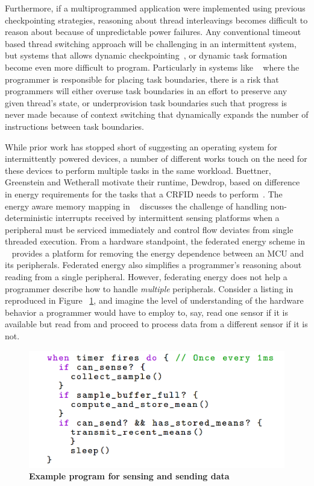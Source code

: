 \documentclass[11pt]{sensys-proc}
\begin{document}
Furthermore, if a multiprogrammed application were implemented using previous
checkpointing strategies, reasoning about thread interleavings becomes  difficult to
reason about because of unpredictable power failures. Any conventional timeout based
thread switching approach will be challenging in an intermittent system, but systems that
allows dynamic checkpointing~\cite{hibernus}, or dynamic task formation~\cite{Dino} become
even more difficult to program. Particularly in systems like ~\cite{Dino} where the
programmer is responsible for placing task boundaries, there is a risk that programmers
will either overuse task boundaries in an effort to preserve any given thread's state, or
underprovision task boundaries such that progress is never made because of context
switching that dynamically expands the number of instructions between task boundaries.

While prior work has stopped short of suggesting an operating system for intermittently
powered devices, a number of different works touch on the need for these devices to
perform multiple tasks in the same workload. Buettner, Greenstein and Wetherall motivate
their runtime, Dewdrop, based on difference in energy requirements for the tasks that a
CRFID needs to perform~\cite{dewdrop}. The energy aware memory mapping in ~\cite{Aware}
discusses the challenge of handling non-deterministic interrupts received by intermittent
sensing platforms when a peripheral must be serviced immediately and control flow deviates
from single threaded execution. From a hardware standpoint, the federated energy scheme in
~\cite{ufop} provides a platform for removing the energy dependence between an MCU and its
peripherals. Federated energy also simplifies a programmer's reasoning about reading from
a single peripheral. However, federating energy does not help a programmer describe how to
handle {\em multiple} peripherals. Consider a listing in
~\cite{ufop} reproduced in Figure ~\ref{fig:copy}, and imagine the level of understanding
of the hardware behavior a programmer would have to employ to, say, read one sensor if it
is available but read from and proceed to process data from a different sensor if it is not.

\begin{figure}[h]
  \centering
  \includegraphics[width=0.99\columnwidth]{figs/listing}
  \caption{{\bf Example program for sensing and sending data}}
  \label{fig:copy}
\end{figure}
\end{document}
